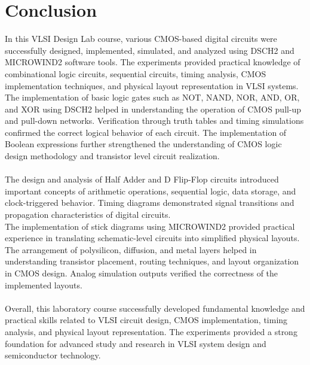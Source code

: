 \documentclass[12pt,a4paper]{report}
\begin{document}
\chapter*{\center Conclusion}
In this VLSI Design Lab course, various CMOS-based digital circuits were successfully designed, implemented, simulated, and analyzed using DSCH2 and MICROWIND2 software tools. The experiments provided practical knowledge of combinational logic circuits, sequential circuits, timing analysis, CMOS implementation techniques, and physical layout representation in VLSI systems.\\ 
The implementation of basic logic gates such as NOT, NAND, NOR, AND, OR, and XOR using DSCH2 helped in understanding the operation of CMOS pull-up and pull-down networks. Verification through truth tables and timing simulations confirmed the correct logical behavior of each circuit. The implementation of Boolean expressions further strengthened the understanding of CMOS logic design methodology and transistor level circuit realization.\\ \\
The design and analysis of Half Adder and D Flip-Flop circuits introduced important concepts of arithmetic operations, sequential logic, data storage, and clock-triggered behavior. Timing diagrams demonstrated signal transitions and propagation characteristics of digital circuits.\\
The implementation of stick diagrams using MICROWIND2 provided practical experience in translating schematic-level circuits into simplified physical layouts. The arrangement of polysilicon, diffusion, and metal layers helped in understanding transistor placement, routing techniques, and layout organization in CMOS design. Analog simulation outputs verified the correctness of the implemented layouts.\\ \\
Overall, this laboratory course successfully developed fundamental knowledge and practical skills related to VLSI circuit design, CMOS implementation, timing analysis, and physical layout representation. The experiments provided a strong foundation for advanced study and research in VLSI system design and semiconductor technology.\\ \\
\end{document}
